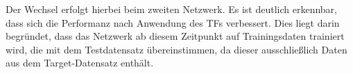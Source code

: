 Der Wechsel erfolgt hierbei beim zweiten Netzwerk. Es ist deutlich erkennbar, dass sich die Performanz nach Anwendung des 
TFs verbessert. Dies liegt darin begründet, dass das Netzwerk ab diesem Zeitpunkt auf Trainingsdaten trainiert wird, die mit dem Testdatensatz 
übereinstimmen, da dieser ausschließlich Daten aus dem Target-Datensatz enthält.
